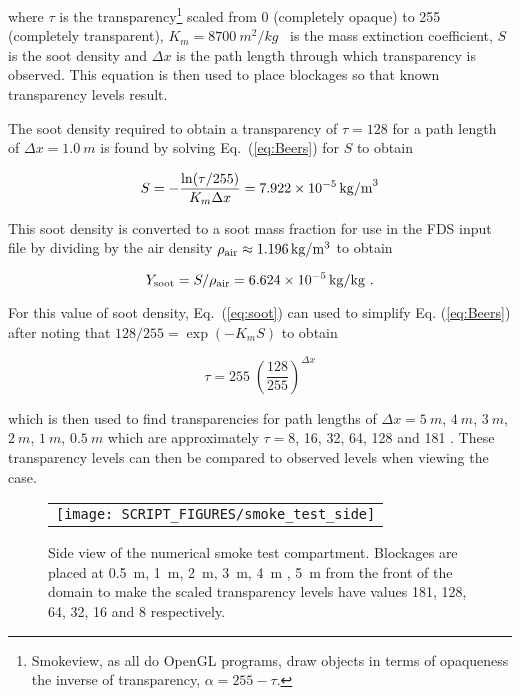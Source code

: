 \documentclass[11pt,twoside]{book}
\begin{document}
\noindent where $\tau$ is the
transparency\footnote{Smokeview, as all do OpenGL programs, draw objects in terms of opaqueness the inverse of transparency, $\alpha = 255 - \tau$.}
scaled from 0 (completely opaque) to 255 (completely transparent), $K_m=\SI{8700}{m^2/kg}$~\cite{Mulholland:F+M} is the mass extinction coefficient, $S$ is the soot density and $\Delta x$ is the path length through which transparency is observed. This equation is then used to place blockages so that known transparency levels result.

The soot density required to obtain a transparency of $\tau=128$ for a path length of $\Delta x=\SI{1.0}{m}$ is found by solving Eq.~(\ref{eq:Beers}) for $S$ to obtain

\begin{equation}
S=-\frac{\ln(\tau/255)}{K_m\Delta x} = 7.922 \times 10^{-5}\,{\rm kg/m}^3
\label{eq:soot}
\end{equation}

\noindent This soot density is converted to a soot mass fraction for use in the FDS input file by dividing by the air density $\rho_{\rm air}\approx \SI{1.196}{kg/m^3}$ to obtain

\begin{equation}
Y_{\rm soot}=S/\rho_{\rm air}=6.624 \times 10^{-5}\,{\rm kg/kg}~.
\end{equation}

\noindent For this value of soot density, Eq.~(\ref{eq:soot}) can used to simplify Eq. (\ref{eq:Beers}) after noting that $128/255=\exp(-K_mS)$ to obtain

\begin{equation}
\tau = 255 \; \left(\frac{128}{255}\right)^{\Delta x}
\label{eq:Beers2}
\end{equation}

\noindent which is then used to find transparencies for path lengths of
$\Delta x=\SI{5}{m}$, $\SI{4}{m}$, $\SI{3}{m}$, $\SI{2}{m}$, $\SI{1}{m}$, $\SI{0.5}{m}$
which are approximately $\tau=8$, 16, 32, 64, 128 and 181 .
These transparency levels can then be compared to observed levels when viewing the case.

\begin{figure}[bph]
\begin{center}
 \centering
\begin{tabular}{c}
 \texttt{[image: SCRIPT\_FIGURES/smoke\_test\_side]}
 \end{tabular}
\end{center}
 \caption[Side view of the numerical smoke test compartment.]{Side view of the numerical
 smoke test compartment.  Blockages are placed at \SI{0.5}{m}, \SI{1}{m}, \SI{2}{m},
 \SI{3}{m}, \SI{4}{m} , \SI{5}{m} from the front of the domain to make the scaled transparency levels have values
 181, 128, 64, 32, 16 and 8 respectively.}
\label{figsmoketestgeom}%
\end{figure}
\end{document}
